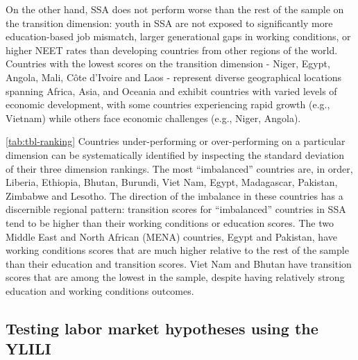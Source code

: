 \documentclass[
  a4paper, twoside, 12pt]{book}
\renewcommand{\hl}[1]{#1}
\newcommand{\hlc}[2][color]{}
\begin{document}
On the other hand, SSA does not perform worse than the rest of the sample on the transition dimension: youth in SSA are not exposed to significantly more education-based job mismatch, larger generational gaps in working conditions, or higher NEET rates than developing countries from other regions of the world.  \hl{Countries with the lowest scores on the transition dimension - Niger, Egypt, Angola, Mali, Côte d'Ivoire and Laos - represent diverse geographical locations spanning Africa, Asia, and Oceania and exhibit countries with varied levels of economic development, with some countries experiencing rapid growth (e.g., Vietnam) while others face economic challenges (e.g., Niger, Angola).}



\hlc[pink]{At the country level, Table }\ref{tab:tbl-ranking} \hlc[pink]{shows that rank correlations across the three YLILI dimensions are low: performance in one dimension does not necessarily imply similar performance in the other two.} Countries under-performing or over-performing on a particular dimension can be systematically identified by inspecting the standard deviation of their three dimension rankings. The most ``imbalanced'' countries are, in order, Liberia, Ethiopia, Bhutan, Burundi, Viet Nam, Egypt, Madagascar, Pakistan, Zimbabwe and Lesotho. The direction of the imbalance in these countries has a discernible regional pattern: transition scores for ``imbalanced'' countries in SSA tend to be higher than their working conditions or education scores. The two Middle East and North African (MENA) countries, Egypt and Pakistan, have working conditions scores that are much higher relative to the rest of the sample than their education and transition scores. Viet Nam and Bhutan have transition scores that are among the lowest in the sample, despite having relatively strong education and working conditions outcomes. \hlc[pink]{These discrepancies highlight that countries do not perform equally well in different dimensions of youth labor market strength and that no single dimension should be considered in isolation; they can also be useful for identifying national policy priorities.}

\hypertarget{testing-labor-market-hypotheses-using-the-ylili}{%
\subsection{Testing labor market hypotheses using the YLILI}\label{testing-labor-market-hypotheses-using-the-ylili}}
\end{document}
